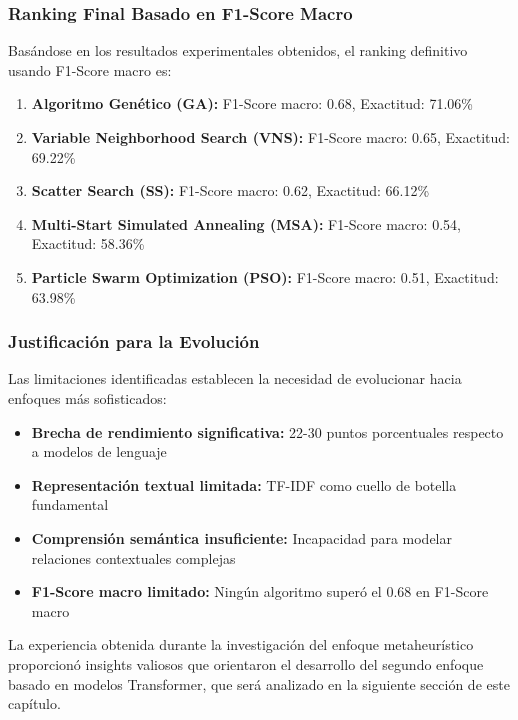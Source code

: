 \subsubsection{Ranking Final Basado en F1-Score Macro}

Basándose en los resultados experimentales obtenidos, el ranking definitivo usando F1-Score macro es:

\begin{enumerate}
    \item \textbf{Algoritmo Genético (GA):} F1-Score macro: 0.68, Exactitud: 71.06\%
    \item \textbf{Variable Neighborhood Search (VNS):} F1-Score macro: 0.65, Exactitud: 69.22\%
    \item \textbf{Scatter Search (SS):} F1-Score macro: 0.62, Exactitud: 66.12\%
    \item \textbf{Multi-Start Simulated Annealing (MSA):} F1-Score macro: 0.54, Exactitud: 58.36\%
    \item \textbf{Particle Swarm Optimization (PSO):} F1-Score macro: 0.51, Exactitud: 63.98\%
\end{enumerate}

\subsubsection{Justificación para la Evolución}

Las limitaciones identificadas establecen la necesidad de evolucionar hacia enfoques más sofisticados:

\begin{itemize}
    \item \textbf{Brecha de rendimiento significativa:} 22-30 puntos porcentuales respecto a modelos de lenguaje
    \item \textbf{Representación textual limitada:} TF-IDF como cuello de botella fundamental
    \item \textbf{Comprensión semántica insuficiente:} Incapacidad para modelar relaciones contextuales complejas
    \item \textbf{F1-Score macro limitado:} Ningún algoritmo superó el 0.68 en F1-Score macro
\end{itemize}

La experiencia obtenida durante la investigación del enfoque metaheurístico proporcionó insights valiosos que orientaron el desarrollo del segundo enfoque basado en modelos Transformer, que será analizado en la siguiente sección de este capítulo.

